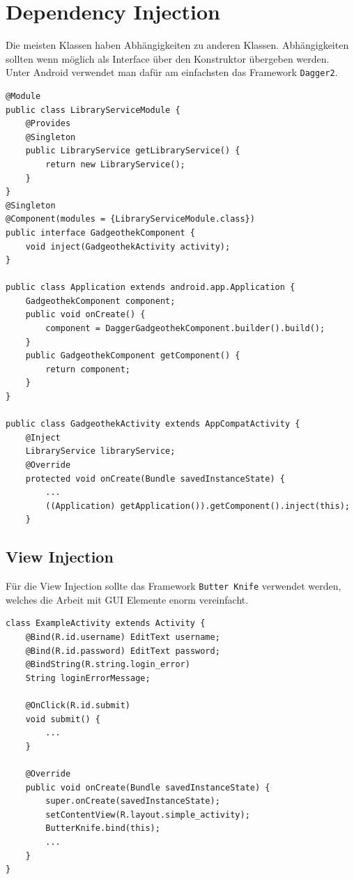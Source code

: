 \section{Dependency Injection}
Die meisten Klassen haben Abhängigkeiten zu anderen Klassen. Abhängigkeiten sollten wenn möglich als Interface über den Konstruktor übergeben werden. Unter Android verwendet man dafür am einfachsten das Framework \lstinline[]|Dagger2|.

\begin{lstlisting}[caption=Dagger2 Dependency Injection]
@Module
public class LibraryServiceModule {
	@Provides
	@Singleton
	public LibraryService getLibraryService() {
		return new LibraryService();
	}
}
@Singleton
@Component(modules = {LibraryServiceModule.class})
public interface GadgeothekComponent {
	void inject(GadgeothekActivity activity);
}

public class Application extends android.app.Application {
	GadgeothekComponent component;
	public void onCreate() {
		component = DaggerGadgeothekComponent.builder().build();
	}
	public GadgeothekComponent getComponent() {  
		return component;
	}
}

public class GadgeothekActivity extends AppCompatActivity {
	@Inject
	LibraryService libraryService;
	@Override
	protected void onCreate(Bundle savedInstanceState) {
		...
		((Application) getApplication()).getComponent().inject(this); 
	}
\end{lstlisting}

\subsection{View Injection}
Für die View Injection sollte das Framework \lstinline[]|Butter Knife| verwendet werden, welches die Arbeit mit GUI Elemente enorm vereinfacht.
\begin{lstlisting}[caption=View Injection mit Butter Knife]
class ExampleActivity extends Activity {
	@Bind(R.id.username) EditText username;
	@Bind(R.id.password) EditText password;
	@BindString(R.string.login_error) 
	String loginErrorMessage;

	@OnClick(R.id.submit) 
	void submit() {
		...
	}
	
	@Override 
	public void onCreate(Bundle savedInstanceState) {
		super.onCreate(savedInstanceState);
		setContentView(R.layout.simple_activity);
		ButterKnife.bind(this);
		...
	}
}
\end{lstlisting}


